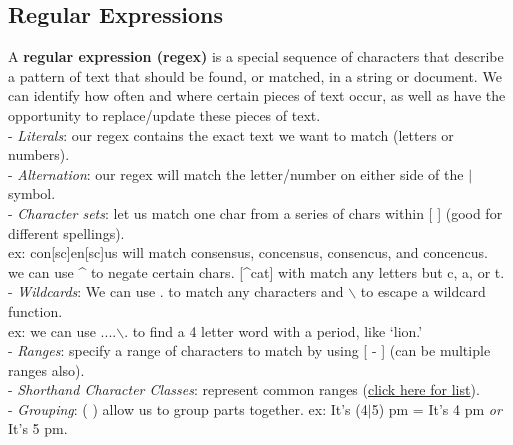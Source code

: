 \documentclass[11pt, a4paper]{article}
\begin{document}
\begin{spacing}{1.1}
	\subsection{Regular Expressions}
	A \textbf{regular expression (regex)} is a special sequence of characters that describe a pattern of text that should be found, or matched, in a string or document. We can identify how often and where certain pieces of text occur, as well as have the opportunity to replace/update these pieces of text. \vspace*{1mm} \\
	\hspace*{3mm} - \textit{Literals}: our regex contains the exact text we want to match (letters or numbers). \\
	\hspace*{3mm} - \textit{Alternation}: our regex will match the letter/number on either side of the $|$ symbol. \\
	\hspace*{3mm} - \textit{Character sets}: let us match one char from a series of chars within [ ] (good for different spellings). \\
	\hspace*{33mm} ex: con[sc]en[sc]us will match consensus, concensus, consencus, and concencus. \\
	\hspace*{33mm} we can use \^{} to negate certain chars. [\^{}cat] with match any letters but c, a, or t. \\
	\hspace*{3mm} - \textit{Wildcards}: We can use . to match any characters and $\backslash$ to escape a wildcard function. \\
	\hspace*{25mm} ex: we can use ....$\backslash$. to find a 4 letter word with a period, like `lion.' \\
	\hspace*{3mm} - \textit{Ranges}: specify a range of characters to match by using [ - ] (can be multiple ranges also).\\
	\hspace*{3mm} - \textit{Shorthand Character Classes}: represent common ranges (\href{https://www.regular-expressions.info/shorthand.html}{click here for list}). \\
	\hspace*{3mm} - \textit{Grouping}: ( ) allow us to group parts together. ex: It's (4$|$5) pm = It's 4 pm \textit{or} It's 5 pm. \\

\end{spacing}
\end{document}
